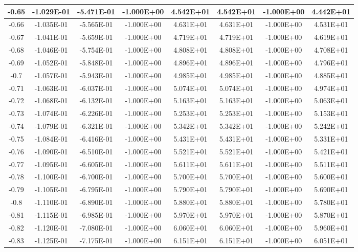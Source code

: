 \documentclass{article}
\begin{document}
\begin{center}
\begin{longtable}{|c|c|c|c|c|c|c|c|}
-0.65 & -1.029E-01 & -5.471E-01 & -1.000E+00 & 4.542E+01 & 4.542E+01 & -1.000E+00 & 4.442E+01 \\ \hline
-0.66 & -1.035E-01 & -5.565E-01 & -1.000E+00 & 4.631E+01 & 4.631E+01 & -1.000E+00 & 4.531E+01 \\ \hline
-0.67 & -1.041E-01 & -5.659E-01 & -1.000E+00 & 4.719E+01 & 4.719E+01 & -1.000E+00 & 4.619E+01 \\ \hline
-0.68 & -1.046E-01 & -5.754E-01 & -1.000E+00 & 4.808E+01 & 4.808E+01 & -1.000E+00 & 4.708E+01 \\ \hline
-0.69 & -1.052E-01 & -5.848E-01 & -1.000E+00 & 4.896E+01 & 4.896E+01 & -1.000E+00 & 4.796E+01 \\ \hline
-0.7 & -1.057E-01 & -5.943E-01 & -1.000E+00 & 4.985E+01 & 4.985E+01 & -1.000E+00 & 4.885E+01 \\ \hline
-0.71 & -1.063E-01 & -6.037E-01 & -1.000E+00 & 5.074E+01 & 5.074E+01 & -1.000E+00 & 4.974E+01 \\ \hline
-0.72 & -1.068E-01 & -6.132E-01 & -1.000E+00 & 5.163E+01 & 5.163E+01 & -1.000E+00 & 5.063E+01 \\ \hline
-0.73 & -1.074E-01 & -6.226E-01 & -1.000E+00 & 5.253E+01 & 5.253E+01 & -1.000E+00 & 5.153E+01 \\ \hline
-0.74 & -1.079E-01 & -6.321E-01 & -1.000E+00 & 5.342E+01 & 5.342E+01 & -1.000E+00 & 5.242E+01 \\ \hline
-0.75 & -1.084E-01 & -6.416E-01 & -1.000E+00 & 5.431E+01 & 5.431E+01 & -1.000E+00 & 5.331E+01 \\ \hline
-0.76 & -1.090E-01 & -6.510E-01 & -1.000E+00 & 5.521E+01 & 5.521E+01 & -1.000E+00 & 5.421E+01 \\ \hline
-0.77 & -1.095E-01 & -6.605E-01 & -1.000E+00 & 5.611E+01 & 5.611E+01 & -1.000E+00 & 5.511E+01 \\ \hline
-0.78 & -1.100E-01 & -6.700E-01 & -1.000E+00 & 5.700E+01 & 5.700E+01 & -1.000E+00 & 5.600E+01 \\ \hline
-0.79 & -1.105E-01 & -6.795E-01 & -1.000E+00 & 5.790E+01 & 5.790E+01 & -1.000E+00 & 5.690E+01 \\ \hline
-0.8 & -1.110E-01 & -6.890E-01 & -1.000E+00 & 5.880E+01 & 5.880E+01 & -1.000E+00 & 5.780E+01 \\ \hline
-0.81 & -1.115E-01 & -6.985E-01 & -1.000E+00 & 5.970E+01 & 5.970E+01 & -1.000E+00 & 5.870E+01 \\ \hline
-0.82 & -1.120E-01 & -7.080E-01 & -1.000E+00 & 6.060E+01 & 6.060E+01 & -1.000E+00 & 5.960E+01 \\ \hline
-0.83 & -1.125E-01 & -7.175E-01 & -1.000E+00 & 6.151E+01 & 6.151E+01 & -1.000E+00 & 6.051E+01 \\ \hline

\end{longtable}
\end{center}
\end{document}
